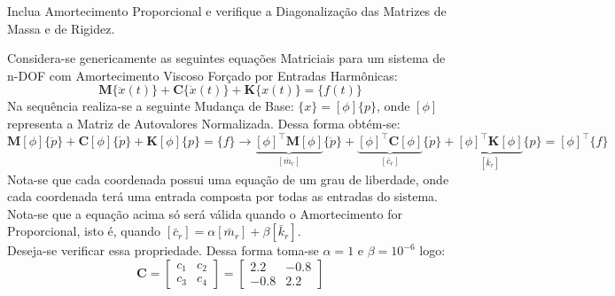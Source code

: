 \documentclass{article}
\begin{document}
\newpage\begin{exercise}\label{ex13}
    Inclua Amortecimento Proporcional e verifique a Diagonalização das Matrizes de Massa e de Rigidez.
\end{exercise}
\begin{resolution}
    Considera-se genericamente as seguintes equações Matriciais para um sistema de n-DOF com Amortecimento Viscoso Forçado por Entradas Harmônicas:
    \begin{equation}
        \mathbf{M}\{\ddot{x}(t)\} + \mathbf{C}\{\dot{x}(t)\} + \mathbf{K}\{x(t)\} = \{f(t)\}
    \end{equation}
    Na sequência realiza-se a seguinte Mudança de Base: $\{x\} = [\phi] \{p\}$, onde $[\phi]$ representa a Matriz de Autovalores Normalizada. Dessa forma obtém-se:
    \begin{equation*}
        \mathbf{M}[\phi]\{\ddot{p}\} + \mathbf{C}[\phi]\{\dot{p}\} + \mathbf{K}[\phi]\{p\} = \{f\} \to
        \underbrace{[\phi]^\intercal\mathbf{M}[\phi]}_{[\bar{m}_{r}]}\{\ddot{p}\} + 
        \underbrace{[\phi]^\intercal\mathbf{C}[\phi]}_{[\bar{c}_{r}]}\{\dot{p}\} + 
        \underbrace{[\phi]^\intercal\mathbf{K}[\phi]}_{[\bar{k}_{r}]}\{p\} = 
        [\phi]^\intercal\{f\}
    \end{equation*}
    Nota-se que cada coordenada possui uma equação de um grau de liberdade, onde cada coordenada terá uma entrada composta por todas as entradas do sistema.\\

    Nota-se que a equação acima só será válida quando o Amortecimento for Proporcional, isto é, quando $[\bar{c}_r] = \alpha [\bar{m}_r] + \beta [\bar{k}_r]$.\\

    Deseja-se verificar essa propriedade. Dessa forma toma-se $\alpha = 1$ e $\beta = 10^{-6}$ logo:
    \begin{equation*}
        \mathbf{C} =  
        \begin{bmatrix} c_1 & c_2\\ c_3 & c_4\end{bmatrix} =
        \begin{bmatrix} 2.2 & -0.8\\ -0.8 & 2.2\end{bmatrix}
    \end{equation*}
    

\end{resolution}
\end{document}
